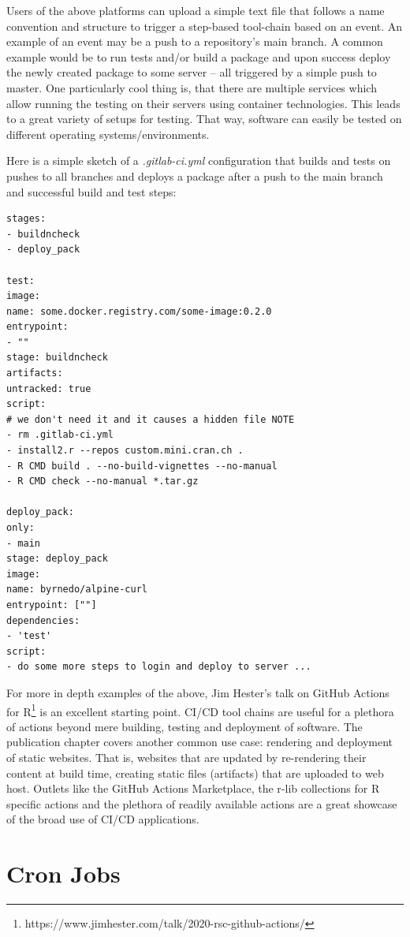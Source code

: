 \documentclass[
  12pt,
  letterpaper,
]{krantz}
\begin{document}
Users of the above platforms can upload a simple text file that follows
a name convention and structure to trigger a step-based tool-chain based
on an event. An example of an event may be a push to a repository's main
branch. A common example would be to run tests and/or build a package
and upon success deploy the newly created package to some server -- all
triggered by a simple push to master. One particularly cool thing is,
that there are multiple services which allow running the testing on
their servers using container technologies. This leads to a great
variety of setups for testing. That way, software can easily be tested
on different operating systems/environments.

Here is a simple sketch of a \emph{.gitlab-ci.yml} configuration that
builds and tests on pushes to all branches and deploys a package after a
push to the main branch and successful build and test steps:

\begin{verbatim}
stages:
- buildncheck
- deploy_pack

test:
image:
name: some.docker.registry.com/some-image:0.2.0
entrypoint:
- ""
stage: buildncheck
artifacts:
untracked: true
script:
# we don't need it and it causes a hidden file NOTE
- rm .gitlab-ci.yml 
- install2.r --repos custom.mini.cran.ch .
- R CMD build . --no-build-vignettes --no-manual
- R CMD check --no-manual *.tar.gz

deploy_pack:
only: 
- main
stage: deploy_pack
image:
name: byrnedo/alpine-curl
entrypoint: [""]
dependencies:
- 'test'
script:
- do some more steps to login and deploy to server ...
\end{verbatim}

For more in depth examples of the above, Jim Hester's talk on
GitHub Actions for R\footnote{https://www.jimhester.com/talk/2020-rsc-github-actions/}
is an excellent starting point. CI/CD tool chains are
useful for a plethora of actions beyond mere building, testing and
deployment of software. The publication chapter covers another common
use case: rendering and deployment of static websites. That is, websites
that are updated by re-rendering their content at build time, creating
static files (artifacts) that are uploaded to web host. Outlets like the
GitHub Actions Marketplace, the r-lib collections for R specific actions
and the plethora of readily available actions are a great showcase of
the broad use of CI/CD applications.

\hypertarget{cron-jobs}{%
\section{\texorpdfstring{Cron
Jobs}{Cron Jobs}}\label{cron-jobs}}
\end{document}
